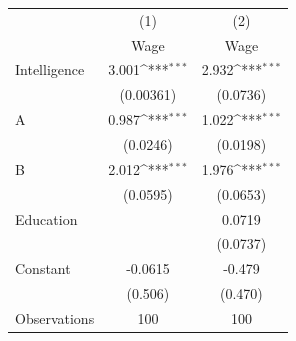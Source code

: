 {
\def\sym#1{\ifmmode^{#1}\else\(^{#1}\)\fi}
\begin{tabular}{l*{2}{c}}
\toprule
                    &\multicolumn{1}{c}{(1)}&\multicolumn{1}{c}{(2)}\\
                    &\multicolumn{1}{c}{Wage}&\multicolumn{1}{c}{Wage}\\
\midrule
Intelligence        &       3.001\sym{***}&       2.932\sym{***}\\
                    &   (0.00361)         &    (0.0736)         \\
\addlinespace
A                   &       0.987\sym{***}&       1.022\sym{***}\\
                    &    (0.0246)         &    (0.0198)         \\
\addlinespace
B                   &       2.012\sym{***}&       1.976\sym{***}\\
                    &    (0.0595)         &    (0.0653)         \\
\addlinespace
Education           &                     &      0.0719         \\
                    &                     &    (0.0737)         \\
\addlinespace
Constant            &     -0.0615         &      -0.479         \\
                    &     (0.506)         &     (0.470)         \\
\midrule
Observations        &         100         &         100         \\
\bottomrule
\end{tabular}
}
